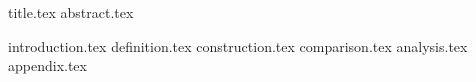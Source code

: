 \documentclass[11pt]{llncs}
\begin{document}
{title.tex}
\thispagestyle{plain}
{abstract.tex}

{introduction.tex}
{definition.tex}
{construction.tex}
{comparison.tex}
{analysis.tex}
\newpage
\appendix
{appendix.tex}



\end{document}
